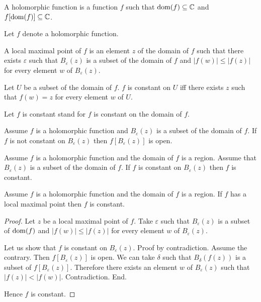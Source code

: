 \documentclass{article}
\newcommand{\Ball}[2]{B_{#1}(#2)}
\begin{document}
\begin{forthel}
    \begin{signature}
      A holomorphic function is a function $f$ such that $\operatorname{dom}(f) \subseteq \mathbb{C}$
and $f[\operatorname{dom}(f)] \subseteq \mathbb{C}$.
    \end{signature}

Let $f$ denote a holomorphic function.

    \begin{definition}
      A local maximal point of $f$ is an element $z$ of the domain of $f$ such that there exists 
$\varepsilon$ such that $\Ball{\varepsilon}{z}$ is a subset of the domain of $f$ and 
$|f(w)| \leq |f(z)|$ for every element $w$ of $\Ball{\varepsilon}{z}$.
    \end{definition}

    \begin{definition}
      Let $U$ be a subset of the domain of $f$. $f$ is constant on $U$ iff there exists 
$z$ such that $f(w) = z$ for every element $w$ of $U$.
    \end{definition}

    Let $f$ is constant stand for $f$ is constant on the domain of $f$.

    \begin{axiom}
      Assume $f$ is a holomorphic function and $\Ball{\varepsilon}{z}$ is a subset of the domain of $f$.
      If $f$ is not constant on $\Ball{\varepsilon}{z}$
        then $f[\Ball{\varepsilon}{z}]$ is open.
    \end{axiom}

    \begin{axiom}
      Assume $f$ is a holomorphic function and the domain of $f$ is a region.
      Assume that $\Ball{\varepsilon}{z}$ is a subset of the domain of $f$.
      If $f$ is constant on $\Ball{\varepsilon}{z}$ then $f$ is constant.
    \end{axiom}

    \begin{proposition}
      Assume $f$ is a holomorphic function and the domain of $f$ is a region.
      If $f$ has a local maximal point then $f$ is constant.
    \end{proposition}
    \begin{proof}
      Let $z$ be a local maximal point of $f$.
      Take $\varepsilon$ such that
        $\Ball{\varepsilon}{z}$ is a subset of $\operatorname{dom}(f)$
        and $|f(w)| \leq |f(z)|$ for every element $w$ of $\Ball{\varepsilon}{z}$.

      Let us show that $f$ is constant on $\Ball{\varepsilon}{z}$.
      Proof by contradiction.
        Assume the contrary.
        Then $f[\Ball{\varepsilon}{z}]$ is open.
        We can take $\delta$ such that
          $\Ball{\delta}{f(z)}$ is a subset of $f[\Ball{\varepsilon}{z}]$.
        Therefore there exists an element $w$ of $\Ball{\varepsilon}{z}$ such that
          $|f(z)| < |f(w)|$. Contradiction.
    	End.

      Hence $f$ is constant.
    \end{proof}
  \end{forthel}
\end{document}
